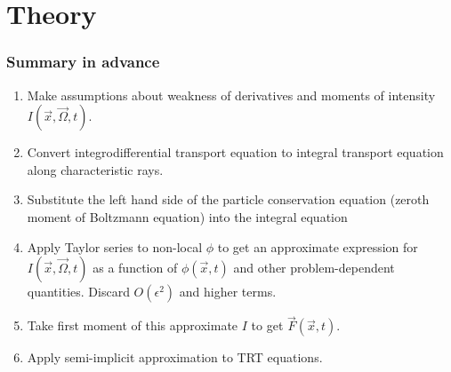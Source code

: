 \documentclass{beamer}
\begin{document}
\section{Theory}
\begin{frame}
  \frametitle{Summary in advance}
  \begin{enumerate}
    \item Make assumptions about weakness of derivatives and moments of
      intensity $I(\vec{x}, \vec{\Omega}, t)$.
    \item Convert integrodifferential transport equation to integral transport
      equation along characteristic rays.
    \item Substitute the left hand side of the particle conservation equation
      (zeroth moment of Boltzmann equation) into the integral equation
    \item Apply Taylor series to non-local $\phi$ to get an approximate
      expression for $I(\vec{x}, \vec{\Omega}, t)$ as a function of
      $\phi(\vec{x}, t)$ and other problem-dependent quantities.
      Discard $O(\epsilon^2)$ and higher terms.
    \item Take first moment of this approximate $I$ to get
      $\vec{F}(\vec{x}, t)$.
    \item Apply semi-implicit approximation to TRT equations.
  \end{enumerate}
\end{frame}
\end{document}
